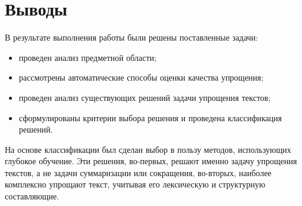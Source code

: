 \chapter*{Выводы}

В результате выполнения работы были решены поставленные задачи: 
\begin{itemize}
	\item проведен анализ предметной области;
	\item рассмотрены автоматические способы оценки качества упрощения;
	\item проведен анализ существующих решений задачи упрощения текстов;
	\item сформулированы критерии выбора решения и проведена классификация решений.
\end{itemize}

На основе классификации был сделан выбор в пользу методов, использующих глубокое обучение. Эти решения, во-первых, решают именно задачу упрощения текстов, а не задачи суммаризации или сокращения, во-вторых, наиболее комплексно упрощают текст, учитывая его лексическую и структурную составляющие.





